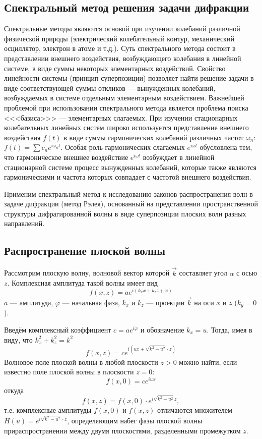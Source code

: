 \subsection{Спектральный метод решения задачи дифракции}
Спектральные методы являются основой при изучении колебаний различной физической природы (электрический колебательный контур, механический осциллятор, электрон в атоме и т.д.). Суть спектрального метода состоит в представлении внешнего воздействия, возбуждающего колебания в линейной системе, в виде суммы некоторых элементарных воздействий. Свойство линейности системы (принцип
суперпозиции) позволяет найти решение задачи в виде соответствующей суммы откликов --- вынужденных колебаний, возбуждаемых в
системе отдельным элементарным воздействием. Важнейшей проблемой при использовании спектрального метода является проблема поиска <<<базиса>>> --- элементарных слагаемых. При изучении стационарных
колебательных линейных систем широко используется представление внешнего воздействия $f(t)$ в виде суммы гармонических колебаний различных частот $\omega_n$: $f(t) = \sum c_n e^{i\omega_n t}$. Особая роль гармонических слагаемых $e^{i\omega t}$ обусловлена тем, что гармоническое внешнее воздействие $e^{i\omega t}$ возбуждает в линейной стационарной системе процесс вынужденных колебаний, которые также являются гармоническими и частота которых совпадает с частотой внешнего воздействия.

Применим спектральный метод к исследованию законов распространения волн в задаче дифракции (метод Рэлея), основанный на представлении пространственной структуры дифрагированной волны в виде суперпозиции плоских волн разных направлений.

\subsection{Распространение плоской волны}
Рассмотрим плоскую волну, волновой вектор которой $\vec{k}$ составляет угол $\alpha$ с осью $z$. Комплексная амплитуда такой волны имеет вид
\[
f(x,z) = ae^{i(k_xx+k_zz+\varphi)}
\]
$a$ --- амплитуда, $\varphi$ --- начальная фаза, $k_x$ и $k_z$ --- проекции $\vec{k}$ на оси $x$ и $z$ ($k_y = 0$).

\begin{figure}[ht!]
\end{figure}

Введём комплексный коэффициент $c = ae^{i\varphi}$ и обозначение $k_x = u$. Тогда, имея в виду, что $k_x^2 + k_z^2 = k^2$
\[
f(x, z) = ce^{i(ux + \sqrt{k^2 - u^2}\cdot z)}
\]
Волновое поле плоской волны в любой плоскости $z > 0$ можно найти, если известно поле плоской волны в плоскости $z=0$:
\[
    f(x, 0) = ce^{iux}
\]
откуда
\[
    f(x, z) = f(x, 0)\cdot e^{i\sqrt{k^2-u^2}z},
\]
т.е. комплексные амплитуды $f(x, 0)$ и $f(x, z)$  отличаются множителем $H(u) = e^{i\sqrt{k^2 - u^2}\cdot z}$,  определяющим набег фазы плоской волны прираспространении между двумя плоскостями, разделенными промежутком $z$.

